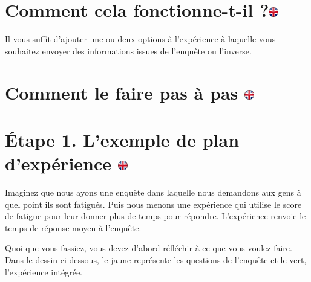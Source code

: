 \documentclass[
]{book}
\begin{document}
\hypertarget{comment-cela-fonctionne-t-il}{%
\section[Comment cela fonctionne-t-il ?]{\texorpdfstring{Comment cela
fonctionne-t-il
?\href{https://www.psytoolkit.org/lessons/var_in_out.html\#_how_it_works}{\protect\includegraphics{img/ukflag.png}}}{Comment cela fonctionne-t-il ?}}\label{comment-cela-fonctionne-t-il}}

Il vous suffit d'ajouter une ou deux options à l'expérience à laquelle
vous souhaitez envoyer des informations issues de l'enquête ou
l'inverse.

\hypertarget{comment-le-faire-pas-uxe0-pas}{%
\section[Comment le faire pas à pas ]{\texorpdfstring{Comment le faire
pas à pas
\href{https://www.psytoolkit.org/lessons/var_in_out.html\#_how_to_do_it_step_by_step}{\protect\includegraphics{img/ukflag.png}}}{Comment le faire pas à pas }}\label{comment-le-faire-pas-uxe0-pas}}

\hypertarget{uxe9tape-1.-lexemple-de-plan-dexpuxe9rience}{%
\section[Étape 1. L'exemple de plan d'expérience ]{\texorpdfstring{Étape
1. L'exemple de plan d'expérience
\href{https://www.psytoolkit.org/lessons/var_in_out.html\#_step_1_the_example_experimental_design}{\protect\includegraphics{img/ukflag.png}}}{Étape 1. L'exemple de plan d'expérience }}\label{uxe9tape-1.-lexemple-de-plan-dexpuxe9rience}}

Imaginez que nous ayons une enquête dans laquelle nous demandons aux
gens à quel point ils sont fatigués. Puis nous menons une expérience qui
utilise le score de fatigue pour leur donner plus de temps pour
répondre. L'expérience renvoie le temps de réponse moyen à l'enquête.

Quoi que vous fassiez, vous devez d'abord réfléchir à ce que vous voulez
faire. Dans le dessin ci-dessous, le jaune représente les questions de
l'enquête et le vert, l'expérience intégrée.
\end{document}
